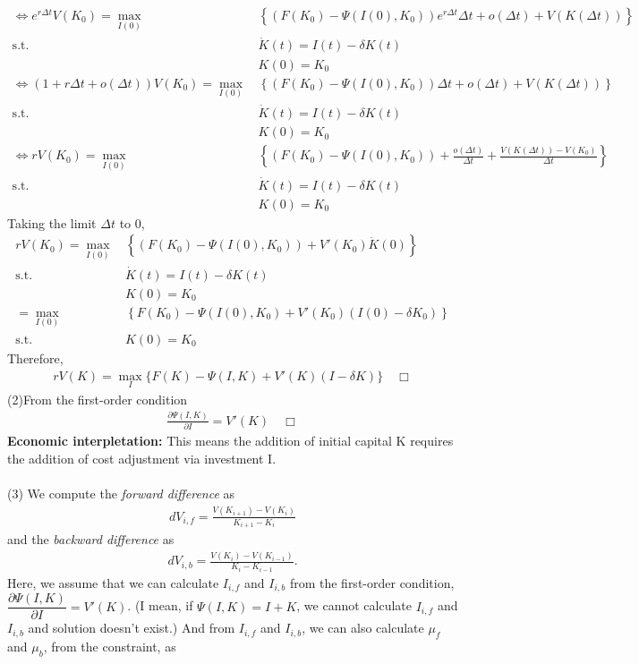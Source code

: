 \documentclass{article}
\begin{document}
\begin{CJK}{UTF8}{min}
\begin{align*}
\Leftrightarrow e^{r\Delta t}V(K_0)=\max_{I(0)} \, &\left\{(F(K_0)-\Psi(I(0),K_0))e^{r\Delta t}\Delta t+o(\Delta t)+V(K(\Delta t))\right\}\\
\mathrm{s.t.} \,\,&\dot K(t)=I(t)-\delta K(t)\\
&K(0)=K_0\\
\Leftrightarrow (1+r\Delta t+o(\Delta t))V(K_0)=\max_{I(0)} \, &\left\{(F(K_0)-\Psi(I(0),K_0))\Delta t+o(\Delta t)+V(K(\Delta t))\right\}\\
\mathrm{s.t.} \,\,&\dot K(t)=I(t)-\delta K(t)\\
&K(0)=K_0\\
\Leftrightarrow  rV(K_0)=\max_{I(0)}  \, &\left\{(F(K_0)-\Psi(I(0),K_0))+\frac{o(\Delta t)}{\Delta t}+\frac{V(K(\Delta t))-V(K_0)}{\Delta t}\right\}\\
\mathrm{s.t.} \,\,&\dot K(t)=I(t)-\delta K(t)\\
&K(0)=K_0
\end{align*}
Taking the limit $\Delta t$ to 0,
\begin{align*}
rV(K_0)=\max_{I(0)} \, &\left\{(F(K_0)-\Psi(I(0),K_0))+V'(K_0)\dot K(0)\right\}\\
\mathrm{s.t.} \,\,&\dot K(t)=I(t)-\delta K(t)\\
&K(0)=K_0\\
=\max_{I(0)}  \, &\left\{F(K_0)-\Psi(I(0),K_0)+V'(K_0)(I(0)-\delta K_0)\right\}\\
\mathrm{s.t.} \,\,&K(0)=K_0
\end{align*}
Therefore,
\begin{align*}
rV(K)=\max_{I}\{F(K)-\Psi(I,K)+V'(K)(I-\delta K)\}\quad \Box
\end{align*}
(2)\quad From the first-order condition
\begin{align*}
\frac{\partial \Psi(I,K)}{\partial I}=V'(K)\quad \Box
\end{align*}
\textbf{Economic interpletation: }This means the addition of initial capital K requires the addition of cost adjustment via investment I.\\
\\(3)\quad
We compute the \emph{forward difference} as
\begin{align*}
dV_{i,f}=\frac{V(K_{i+1})-V(K_i)}{K_{i+1}-K_i}
\end{align*}
and the \emph{backward difference} as
\begin{align*}
dV_{i,b}=\frac{V(K_{i})-V(K_{i-1})}{K_{i}-K_{i-1}}.
\end{align*}
Here, we assume that we can calculate $I_{i,f}$ and $I_{i,b}$ from the first-order condition, \\$\dfrac{\partial \Psi(I,K)}{\partial I}=V'(K)$. (I mean, if $\Psi(I,K)=I+K$, we cannot calculate $I_{i,f}$ and $I_{i,b}$ and solution doesn't exist.) And from $I_{i,f}$ and $I_{i,b}$, we can also calculate $\mu_f$ and $\mu_b$, from the constraint, as

\end{CJK}
\end{document}
